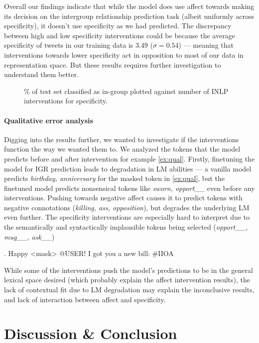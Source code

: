 Overall our findings indicate that while the model does use affect towards making its decision on the intergroup relationship prediction task (albeit uniformly across specificity), it doesn't use specificity as we had predicted. The discrepancy between high and low specificity interventions could be because the average specificity of tweets in our training data is 3.49 ($\sigma=0.54$) --- meaning that interventions towards lower specificity act in opposition to most of our data in representation space. But these results requires further investigation to understand them better.

\begin{figure}[t]
    \centering
    
    \caption{\% of test set classified as in-group plotted against number of INLP interventions for specificity.}
    \label{fig:spec}
\end{figure}

\paragraph{Qualitative error analysis} Digging into the results further, we wanted to investigate if the interventions function the way we wanted them to. We analyzed the tokens that the model predicts before and after intervention for example \ref{ex:qual}. Firstly, finetuning the model for IGR prediction leads to degradation in LM abilities --- a vanilla model predicts \emph{birthday, anniversary} for the masked token in \ref{ex:qual}, but the finetuned model predicts nonsensical tokens like \emph{sworn, opport\_\_} even before any interventions. Pushing towards negative affect causes it to predict tokens with negative connotations (\emph{killing, ass, opposition}), but degrades the underlying LM even further. The specificity interventions are especially hard to interpret due to the semantically and syntactically implausible tokens being selected (\emph{opport\_\_, mug\_\_, ask\_\_}) 

\ex.\label{ex:qual} Happy <mask> @USER! I got you a new bill: \#IIOA

While some of the interventions push the model's predictions to be in the general lexical space desired (which probably explain the affect intervention results), the lack of contextual fit due to LM degradation may explain the inconclusive results, and lack of interaction between affect and specificity.



\section{Discussion \& Conclusion}

